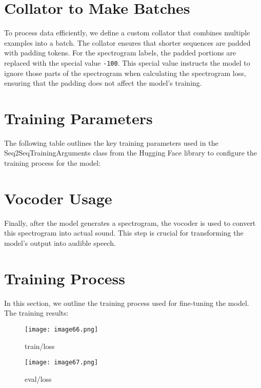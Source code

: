\documentclass[12pt]{article}
\begin{document}
\setcounter{section}{0}  %

\section{Collator to Make Batches}

To process data efficiently, we define a custom collator that combines multiple examples into a batch. The collator ensures that shorter sequences are padded with padding tokens. For the spectrogram labels, the padded portions are replaced with the special value \texttt{-100}. This special value instructs the model to ignore those parts of the spectrogram when calculating the spectrogram loss, ensuring that the padding does not affect the model's training.

\section{Training Parameters}

The following table outlines the key training parameters used in the Seq2SeqTrainingArguments class from the Hugging Face library to configure the training process for the model:


\section{Vocoder Usage}

Finally, after the model generates a spectrogram, the vocoder is used to convert this spectrogram into actual sound. This step is crucial for transforming the model's output into audible speech.

\section{Training Process}

In this section, we outline the training process used for fine-tuning the model. The training results:
\begin{itemize}
\begin{figure}[h]
    \centering
    \texttt{[image: image66.png]}
    \caption{train/loss}
    \label{fig:enter-label}
\end{figure}

\begin{figure}[h]
    \centering
    \texttt{[image: image67.png]}
    \caption{eval/loss}
    \label{fig:enter-label}
\end{figure}
  
\end{itemize}
\end{document}
